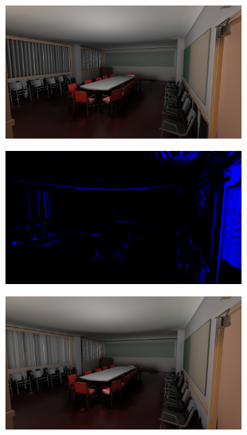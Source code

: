 \begin{figure}[H]
	\centering
	\begin{subfigure}[b]{.49\linewidth}
		\centering
		\captionsetup{justification=centering}
		\includegraphics[width=\linewidth]{media/finals/conf_gi_256.png}
	\end{subfigure}%
	\hspace{0.01\textwidth}
	\begin{subfigure}[b]{.49\linewidth}
		\centering
		\captionsetup{justification=centering}
		\includegraphics[width=\linewidth]{media/finals/conf_gi_256_diff.png}
	\end{subfigure}%
	\par\smallskip
	\begin{subfigure}[b]{.49\linewidth}
		\centering
		\captionsetup{justification=centering}
		\includegraphics[width=\linewidth]{media/finals/conf_gi_128.png}

\end{subfigure}
\end{figure}
